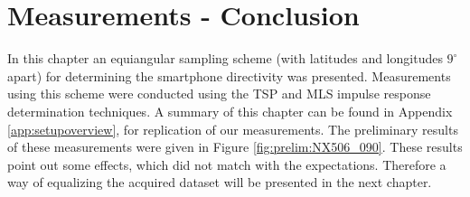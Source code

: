 \section*{Measurements - Conclusion}
In this chapter an equiangular sampling scheme (with latitudes and longitudes $9^ \circ$ apart) for determining the smartphone directivity was presented.
Measurements using this scheme were conducted using the TSP and MLS impulse response determination techniques.
A summary of this chapter can be found in Appendix \ref{app:setupoverview}, for replication of our measurements.
The preliminary results of these measurements were given in Figure \ref{fig:prelim:NX506_090}. These results point out some effects, which did not match with the expectations. Therefore a way of equalizing the acquired dataset will be presented in the next chapter.

